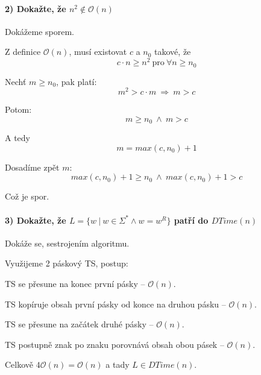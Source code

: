 \paragraph*{2) Dokažte, že $ n^2 \not\in \mathcal{O}(n) $} \begin{compactitem}
    \item Dokážeme sporem.

    \item Z definice $\mathcal{O}(n)$, musí existovat $c$ a $n_0$ takové, že $$ c \cdot n \geq n^2 ~\text{pro}~ \forall n \geq n_0 $$

    \item Nechť $m \geq n_0$, pak platí: $$ m^2 > c \cdot m ~\Rightarrow~ m > c $$

    \item Potom: $$ m \geq n_0 ~\land~ m > c $$

    \item A tedy $$ m = max(c, n_0) + 1$$

    \item Dosadíme zpět $m$: $$ max(c, n_0) + 1 \geq n_0 ~\land~ max(c, n_0) + 1 > c $$

    \item Což je spor.
\end{compactitem}

\paragraph*{3) Dokažte, že $ L = \{ w ~|~ w \in \Sigma^* \land w=w^R \} $ patří do $ DTime(n) $} \begin{compactitem}
    \item Dokáže se, sestrojením algoritmu.
    \item Využijeme 2 páskový TS, postup: \begin{compactenum}
        \item TS se přesune na konec první pásky -- $\mathcal{O}(n)$.
        \item TS kopíruje obsah první pásky od konce na druhou pásku -- $\mathcal{O}(n)$.
        \item TS se přesune na začátek druhé pásky -- $\mathcal{O}(n)$.
        \item TS postupně znak po znaku porovnává obsah obou pásek -- $\mathcal{O}(n)$.
    \end{compactenum}
    \item Celkově $4 \mathcal{O}(n) = \mathcal{O}(n)$ a tady $L \in DTime(n)$.
\end{compactitem}


